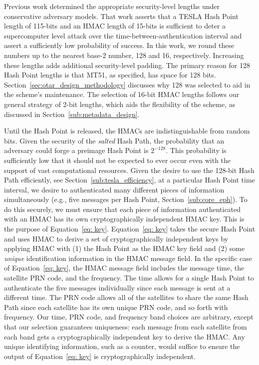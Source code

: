 \documentclass[APA,STIX1COL]{IONjournal/ION-APA Template}
\begin{document}
		Previous work determined the appropriate security-level lengths under conservative adversary models\cite{Neish_Dissertation}.
		That work asserts that a TESLA Hash Point length of 115-bits and an HMAC length of 15-bits is sufficient to deter a supercomputer level attack over the time-between-authentication interval and assert a sufficiently low probability of success.
		In this work, we round these numbers up to the nearest base-2 number, 128 and 16, respectively.
		Increasing these lengths adds additional security-level padding.
		The primary reason for 128 Hash Point lengths is that MT51, as specified, has space for 128 bits.
		Section~\ref{sec:otar_design_methodology} discusses why 128 was selected to aid in the scheme's maintenance.
		The selection of 16-bit HMAC lengths follows our general strategy of 2-bit lengths, which aids the flexibility of the scheme, as discussed in Section~\ref{sub:metadata_design}.

		Until the Hash Point is released, the HMACs are indistinguishable from random bits.
		Given the security of the {\em salted} Hash Path, the probability that an adversary could forge a preimage Hash Point is $2^{-128}$.
		This probability is sufficiently low that it should not be expected to ever occur even with the support of vast computational resources.
		Given the desire to use the 128-bit Hash Path efficiently, see Section~\ref{sub:tesla_efficiency}, at a particular Hash Point time interval, we desire to authenticated many different pieces of information simultaneously (e.g., five messages per Hash Point, Section~\ref{sub:core_eph}).
		To do this securely, we must ensure that each piece of information authenticated with an HMAC has its own cryptographically independent HMAC key.
		This is the purpose of Equation~\eqref{eq: key}.
		Equation~\eqref{eq: key} takes the secure Hash Point and uses HMAC to derive a set of cryptographically independent keys by applying HMAC with (1) the Hash Point as the HMAC key field and (2) some {\em unique} identification information in the HMAC message field.
		In the specific case of Equation~\eqref{eq: key}, the HMAC message field includes the message time, the satellite PRN code, and the frequency.
		The time allows for a single Hash Point to authenticate the five messages individually since each message is sent at a different time.
		The PRN code allows all of the satellites to share the same Hash Path since each satellite has its own unique PRN code, and so forth with frequency.
		Our time, PRN code, and frequency band choices are arbitrary, except that our selection guarantees uniqueness: each message from each satellite from each band gets a cryptographically independent key to derive the HMAC.
		Any unique identifying information, such as a counter, would suffice to ensure the output of Equation~\eqref{eq: key} is cryptographically independent.
\end{document}

